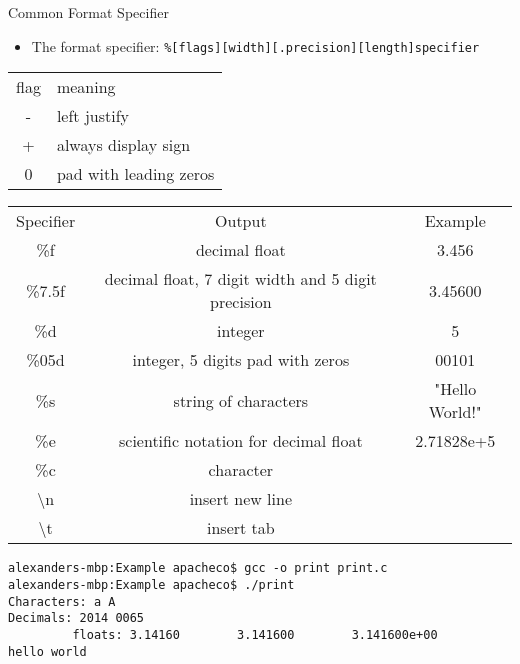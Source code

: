 \documentclass[10pt,t]{beamer}
\begin{document}
\begin{frame}[fragile]{Common Format Specifier}
  \begin{itemize}
    \item The format specifier: \lstinline|%[flags][width][.precision][length]specifier| 
  \end{itemize}
  \begin{center}
    \begin{tabular}{cl}
      \rowcolor{lublue}flag & meaning \\
      \rowcolor{lulime}- & left justify \\
      \rowcolor{lulime}+ & always display sign\\
      \rowcolor{lulime}0 & pad with leading zeros\\
    \end{tabular}
  \end{center}
  \begin{center}
    \begin{tabular}{ccc}
      \rowcolor{lublue}Specifier & Output & Example\\
      \rowcolor{lulime}\%f & decimal float & 3.456 \\
      \rowcolor{lulime!80}\%7.5f & decimal float, 7 digit width and 5 digit precision & 3.45600 \\
      \rowcolor{lulime}\%d & integer & 5\\
      \rowcolor{lulime!70}\%05d & integer, 5 digits pad with zeros & 00101 \\
      \rowcolor{lulime}\%s & string of characters & "Hello World!"\\
      \rowcolor{lulime!60}\%e & scientific notation for decimal float & 2.71828e+5  \\
      \rowcolor{lulime}\%c & character &  \\
      \rowcolor{lulime!50}\textbackslash{}n & insert new line & \\
      \rowcolor{lulime}\textbackslash{}t & insert tab & \\
    \end{tabular}
  \end{center}
\end{frame}

\begin{frame}[fragile]{}
  
  \begin{lstlisting}[style=LINUX]
alexanders-mbp:Example apacheco$ gcc -o print print.c
alexanders-mbp:Example apacheco$ ./print
Characters: a A 
Decimals: 2014 0065
         floats: 3.14160        3.141600        3.141600e+00 
hello world 

  \end{lstlisting}
\end{frame}
\end{document}
